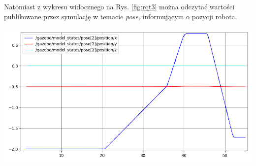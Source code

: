 Natomiast z wykresu widocznego na Rys. \ref{fig:rqt3} można odczytać wartości publikowane przez symulację w temacie \textit{pose}, informującym o pozycji robota.

\begin{center}
    \includegraphics[width=0.9\linewidth]{files/rqt3.png}
    \label{fig:rqt3}
\end{center}